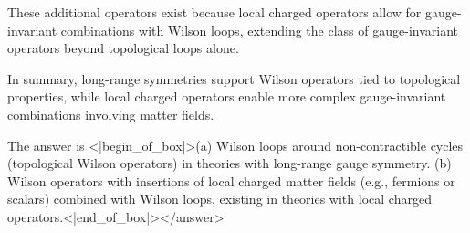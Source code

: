 These additional operators exist because local charged operators allow for gauge-invariant combinations with Wilson loops, extending the class of gauge-invariant operators beyond topological loops alone.  

In summary, long-range symmetries support Wilson operators tied to topological properties, while local charged operators enable more complex gauge-invariant combinations involving matter fields.  

The answer is <|begin_of_box|>(a) Wilson loops around non-contractible cycles (topological Wilson operators) in theories with long-range gauge symmetry.  
(b) Wilson operators with insertions of local charged matter fields (e.g., fermions or scalars) combined with Wilson loops, existing in theories with local charged operators.<|end_of_box|></answer>